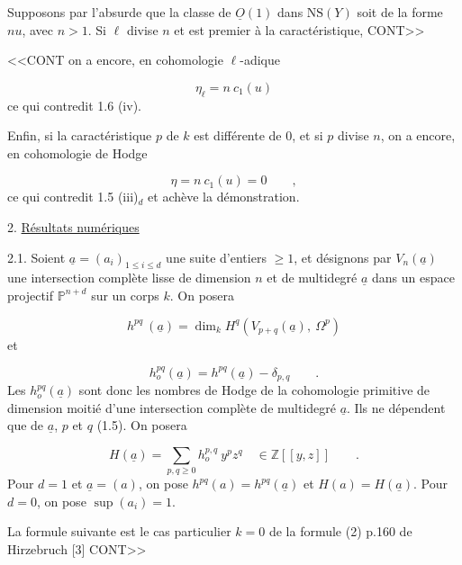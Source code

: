 Supposons par l'absurde que la classe de $\underline{O}(1)$ dans $\mathrm{NS}(Y)$ soit de la forme $nu$, avec $n > 1$. Si $\ell$ divise $n$ et est premier à la caractéristique, CONT>>



<<CONT on a encore, en cohomologie $\ell$-adique

\begin{equation*}
\eta_\ell = n\ c_1(u)
\end{equation*}
ce qui contredit 1.6 (iv).

Enfin, si la caractéristique $p$ de $k$ est différente de $0$, et si $p$ divise $n$, on a encore, en cohomologie de Hodge

\begin{equation*}
\eta = n\ c_1(u) = 0 \qquad ,
\end{equation*}
ce qui contredit 1.5 (iii)$_d$ et achève la démonstration.


2. \underline{Résultats numériques}

2.1. Soient $\underline{a}=(a_i)_{1\leq i\leq d}$ une suite d'entiers $\geq 1$, et désignons par $V_n(\underline{a})$ une intersection complète lisse de dimension $n$ et de multidegré $\underline{a}$ dans un espace projectif $\mathbb{P}^{n+d}$ sur un corps $k$. On posera

\begin{equation*}
h^{pq}\ (\underline{a}) = \dim_k H^q(V_{p+q}(\underline{a}),\ \Omega^p)
\end{equation*}
et

\begin{equation*}
h_o^{pq}(\underline{a}) = h^{pq}(\underline{a}) - \delta_{p,q} \qquad .
\end{equation*}
Les $h_o^{pq}(\underline{a})$ sont donc les nombres de Hodge de la cohomologie primitive de dimension moitié d'une intersection complète de multidegré $\underline{a}$. Ils ne dépendent que de $\underline{a}$, $p$ et $q$ (1.5). On posera

\begin{equation}\tag{2.1.1}
H(\underline{a}) = \sum_{p,q\geq 0} h_o^{p,q}\ y^p z^q \quad \in \mathbb{Z}[[y,z]] \qquad .
\end{equation}
Pour $d = 1$ et $\underline{a} = (a)$, on pose $h^{pq}(a) = h^{pq}(\underline{a})$ et $H(a) = H(\underline{a})$. Pour $d = 0$, on pose $\sup(a_i) = 1$.

La formule suivante est le cas particulier $k = 0$ de la formule (2) p.160 de Hirzebruch [3] CONT>>


